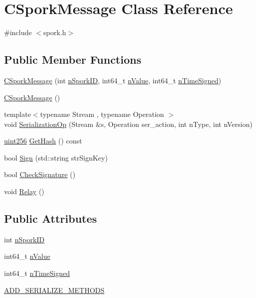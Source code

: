 \hypertarget{class_c_spork_message}{}\section{C\+Spork\+Message Class Reference}
\label{class_c_spork_message}


{\ttfamily \#include $<$spork.\+h$>$}

\subsection*{Public Member Functions}
\begin{DoxyCompactItemize}
\item 
\mbox{\hyperlink{class_c_spork_message_abc84dcd84cc8853a5cebda2a48398b95}{C\+Spork\+Message}} (int \mbox{\hyperlink{class_c_spork_message_a081216533339aed53adbb0dad2a78f73}{n\+Spork\+ID}}, int64\+\_\+t \mbox{\hyperlink{class_c_spork_message_ae15a1fa999993177b2549c4316c89643}{n\+Value}}, int64\+\_\+t \mbox{\hyperlink{class_c_spork_message_a66a80692ffda8526efa272bb2847030b}{n\+Time\+Signed}})
\item 
\mbox{\hyperlink{class_c_spork_message_a1b5c7dbbb69725321297410417800c63}{C\+Spork\+Message}} ()
\item 
{\footnotesize template$<$typename Stream , typename Operation $>$ }\\void \mbox{\hyperlink{class_c_spork_message_a9c8cdb184cb0f7ddcf490eb9efe147ec}{Serialization\+Op}} (Stream \&s, Operation ser\+\_\+action, int n\+Type, int n\+Version)
\item 
\mbox{\hyperlink{classuint256}{uint256}} \mbox{\hyperlink{class_c_spork_message_a50491d24c6ec40d107e6a6d385faae72}{Get\+Hash}} () const
\item 
bool \mbox{\hyperlink{class_c_spork_message_aa41c57e7ac23f5687be8d1679081f1d7}{Sign}} (std\+::string str\+Sign\+Key)
\item 
bool \mbox{\hyperlink{class_c_spork_message_ad32681a192c7a5a1214cd38ee7d16296}{Check\+Signature}} ()
\item 
void \mbox{\hyperlink{class_c_spork_message_ab3898807e869fb008a05f6b37333f1a9}{Relay}} ()
\end{DoxyCompactItemize}
\subsection*{Public Attributes}
\begin{DoxyCompactItemize}
\item 
int \mbox{\hyperlink{class_c_spork_message_a081216533339aed53adbb0dad2a78f73}{n\+Spork\+ID}}
\item 
int64\+\_\+t \mbox{\hyperlink{class_c_spork_message_ae15a1fa999993177b2549c4316c89643}{n\+Value}}
\item 
int64\+\_\+t \mbox{\hyperlink{class_c_spork_message_a66a80692ffda8526efa272bb2847030b}{n\+Time\+Signed}}
\item 
\mbox{\hyperlink{class_c_spork_message_afcbd5a0f8bdeebe3794088bf29136071}{A\+D\+D\+\_\+\+S\+E\+R\+I\+A\+L\+I\+Z\+E\+\_\+\+M\+E\+T\+H\+O\+DS}}
\end{DoxyCompactItemize}
